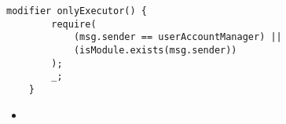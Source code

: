 \begin{lstlisting}[firstnumber=543]
    modifier onlyExecutor() {
        require(
            (msg.sender == userAccountManager) ||
            (isModule.exists(msg.sender))
        );
        _;
    }
\end{lstlisting}

\noindent\begin{itemize}
  \item {}
\end{itemize}


